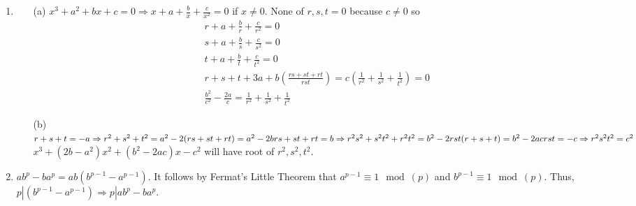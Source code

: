 \documentclass[10pt]{article}
\begin{document}
\begin{enumerate}[label= (Q-\arabic*)]
\begin{itemize}
\end{itemize}
\item \begin{itemize}
    \item [(a)] $x^3+a^2+bx+c=0\Rightarrow x+a+\frac{b}{x}+\frac{c}{x^2}=0$ if $x\neq0$. None of $r,s,t=0$ because $c\neq0$ so\\
    \begin{align*}
        r+a+\frac{b}{r}+\frac{c}{r^2}=0\\
        s+a+\frac{b}{s}+\frac{c}{s^2}=0\\
        t+a+\frac{b}{t}+\frac{c}{t^2}=0\\
        r+s+t+3a+b(\frac{rs+st+rt}{rst})=c(\frac{1}{r^2}+\frac{1}{s^2}+\frac{1}{t^2})=0\\
        \frac{b^2}{c^2}-\frac{2a}{c}=\frac{1}{r^2}+\frac{1}{s^2}+\frac{1}{t^2}
    \end{align*}
    \item [(b)] $r+s+t=-a\Rightarrow r^2+s^2+t^2=a^2-2(rs+st+rt)=a^2-2b\\
    rs+st+rt=b\Rightarrow r^2s^2+s^2t^2+r^2t^2=b^2-2rst(r+s+t)=b^2-2ac\\
    rst=-c\Rightarrow r^2s^2t^2=c^2$\\
    $x^3+(2b-a^2)x^2+(b^2-2ac)x-c^2$ will have root of $r^2,s^2,t^2$.
\end{itemize}
\item $ab^p-ba^p=ab(b^{p-1}-a^{p-1})$. It follows by Fermat's Little Theorem that $a^{p-1}\equiv1\mod(p)$ and $b^{p-1}\equiv1\mod(p)$. Thus, $p|(b^{p-1}-a^{p-1})\Rightarrow p|ab^p-ba^p$.
\end{enumerate}
\end{document}
